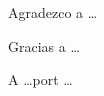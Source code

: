 \begin{flushright}
    \vspace*{5cm}
    \medskip
    Agradezco a  \dots

    Gracias a \dots

    A \dots port \dots
\end{flushright}


